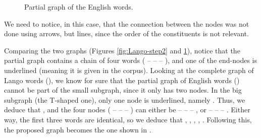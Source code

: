 \begin{refsection}
\begin{mysolution}
\begin{description}
\begin{figure}
\centering
{}
\caption{Partial graph of the English words.}
\label{fig:Lango-EN-partial}
\end{figure}
\end{description}

We need to notice, in this case, that the connection between the nodes was not done using arrows, but lines, since the order of the constituents is not relevant.

Comparing the two graphs (Figures \ref{fig:Lango-step2} and \ref{fig:Lango-EN-partial}), notice that the partial graph  contains a chain of four words ( --  --  -- ), and one of the end-nodes is underlined (meaning it is given in the corpus). Looking at the complete graph of Lango words (), we know for sure that the partial graph of English words () cannot be part of the small subgraph, since it only has two nodes. In the big subgraph (the T-shaped one), only one node is underlined, namely . Thus, we deduce that , and the four nodes ( --  --  -- ) can either be  --  --  -- , or  --  --  -- . Either way, the first three words are identical, so we deduce that , , , , . Following this, the proposed graph becomes the one shown in .
\end{mysolution}


\end{refsection}
